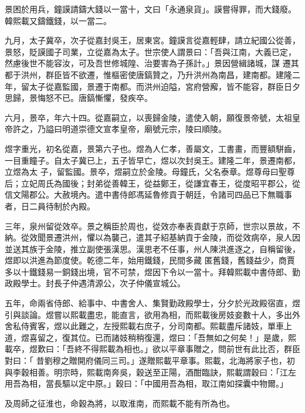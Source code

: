 \begin{pinyinscope}
 景困於用兵，鐘謨請鑄大錢以一當十，文曰「永通泉貨」。謨嘗得罪，而大錢廢。韓熙載又鑄鐵錢，以一當二。



 九月，太子冀卒，次子從嘉封吳王，居東宮。鐘謨言從嘉輕肆，請立紀國公從善，景怒，貶謨國子司業，立從嘉為太子。世宗使人謂景曰：「吾與江南，大義已定，然慮後世不能容汝，可及吾世修城隍、治要害為子孫計。」景因營緝諸城，謀
 遷其都于洪州，群臣皆不欲遷，惟樞密使唐鎬贊之，乃升洪州為南昌，建南都。建隆二年，留太子從嘉監國，景遷于南都。而洪州迫隘，宮府營廨，皆不能容，群臣日夕思歸，景悔怒不已。唐鎬慚懼，發疾卒。



 六月，景卒，年六十四。從嘉嗣立，以喪歸金陵，遣使入朝，願復景帝號，太祖皇帝許之，乃謚曰明道崇德文宣孝皇帝，廟號元宗，陵曰順陵。



 煜字重光，初名從嘉，景第六子也。煜為人仁孝，善屬文，工書畫，而豐額駢齒，一目重瞳子。自太子冀已上，五子皆早亡，煜以次封吳王。建隆二年，景遷南都，立煜為太
 子，留監國。景卒，煜嗣立於金陵。母鐘氏，父名泰章。煜尊母曰聖尊后；立妃周氏為國後；封弟從善韓王，從益鄭王，從謙宜春王，從度昭平郡公，從信文陽郡公。大赦境內。遣中書侍郎馮延魯修貢于朝廷，令諸司四品已下無職事者，日二員待制於內殿。



 三年，泉州留從效卒。景之稱臣於周也，從效亦奉表貢獻于京師，世宗以景故，不納。從效聞景遷洪州，懼以為襲己，遣其子紹基納貢于金陵，而從效病卒，泉人因並送其族于金陵，推立副使張漢思。漢思老不任事，州人陳洪進逐之，自稱留後，煜即以洪進為節度使。乾德二年，始用鐵錢，民間多藏
 匿舊錢，舊錢益少，商賈多以十鐵錢易一銅錢出境，官不可禁，煜因下令以一當十。拜韓熙載中書侍郎、勤政殿學士。封長子仲遇清源公，次子仲儀宣城公。



 五年，命兩省侍郎、給事中、中書舍人、集賢勤政殿學士，分夕於光政殿宿直，煜引與談論。煜嘗以熙載盡忠，能直言，欲用為相，而熙載後房妓妾數十人，多出外舍私侍賓客，煜以此難之，左授熙載右庶子，分司南都。熙載盡斥諸妓，單車上道，煜喜留之，復其位。已而諸妓稍稍復還，煜曰：「吾無如之何矣！」是歲，熙載卒，煜歎曰：「吾終不得熙載為相也。」欲以平章事贈之，問前世有此比否，群臣對曰：「
 昔劉穆之贈開府儀同三司。」遂贈熙載平章事。熙載，北海將家子也，初與李穀相善。明宗時，熙載南奔吳，穀送至正陽，酒酣臨訣，熙載謂穀曰：「江左用吾為相，當長驅以定中原。」穀曰：「中國用吾為相，取江南如探囊中物爾。」



 及周師之征淮也，命穀為將，以取淮南，而熙載不能有所為也。




\end{pinyinscope}
